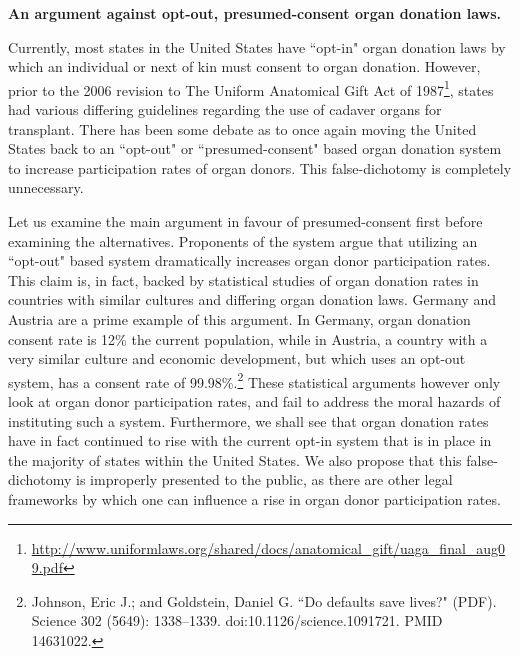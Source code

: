 \documentclass[letterpaper,10pt,twoside]{article}
\begin{document}
\begin{center}
\textbf{\large{An argument against opt-out, presumed-consent organ donation laws.}}
\end{center}
\vspace{0.5em}
Currently, most states in the United States have ``opt-in" organ donation laws by which an individual or next of kin must consent to organ donation.  However, prior to the 2006 revision to The Uniform Anatomical Gift Act of 1987\footnote{\url{http://www.uniformlaws.org/shared/docs/anatomical_gift/uaga_final_aug09.pdf}}, states had various differing guidelines regarding the use of cadaver organs for transplant.  There has been some debate as to once again moving the United States back to an ``opt-out" or ``presumed-consent" based organ donation system to increase participation rates of organ donors.  This false-dichotomy is completely unnecessary.  

Let us examine the main argument in favour of presumed-consent first before examining the alternatives.  Proponents of the system argue that utilizing an ``opt-out" based system dramatically increases organ donor participation rates.  This claim is, in fact, backed by statistical studies of organ donation rates in countries with similar cultures and differing organ donation laws.  Germany and Austria are a prime example of this argument.  In Germany, organ donation consent rate is 12\% the current population, while in Austria, a country with a very similar culture and economic development, but which uses an opt-out system, has a consent rate of 99.98\%.\footnote{ Johnson, Eric J.; and Goldstein, Daniel G. ``Do defaults save lives?" (PDF). Science 302 (5649): 1338–1339. doi:10.1126/science.1091721. PMID 14631022.}  These statistical arguments however only look at organ donor participation rates, and fail to address the moral hazards of instituting such a system.  Furthermore, we shall see that organ donation rates have in fact continued to rise with the current opt-in system that is in place in the majority of states within the United States.  We also propose that this false-dichotomy is improperly presented to the public, as there are other legal frameworks by which one can influence a rise in organ donor participation rates.
\end{document}

